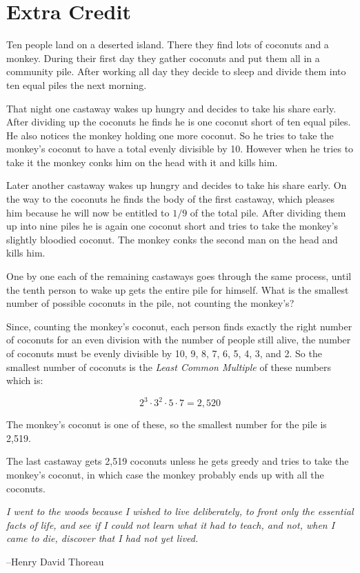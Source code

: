 \documentclass[fleqn,addpoints]{exam}
\begin{document}
\section{Extra Credit}
\begin{questions}

\question
Ten people land on a deserted island. There they find lots of coconuts and a monkey. During their first day they gather
coconuts and put them all in a community pile. After working all day they decide to sleep and divide them into ten equal
piles the next morning.

That night one castaway wakes up hungry and decides to take his share early. After dividing up the coconuts he finds he
is one coconut short of ten equal piles. He also notices the monkey holding one more coconut. So he tries to take the
monkey's coconut to have a total evenly divisible by 10. However when he tries to take it the monkey conks him on the
head with it and kills him.

Later another castaway wakes up hungry and decides to take his share early. On the way to the coconuts he finds the body
of the first castaway, which pleases him because he will now be entitled to $1/9$ of the total pile. After dividing them
up into nine piles he is again one coconut short and tries to take the monkey's slightly bloodied coconut. The monkey
conks the second man on the head and kills him.

One by one each of the remaining castaways goes through the same process, until the tenth person to wake up gets the
entire pile for himself. What is the smallest number of possible coconuts in the pile, not counting the monkey's?

\begin{solution}

Since, counting the monkey's coconut, each person finds exactly the right number of coconuts for an even division with
the number of people still alive, the number of coconuts must be evenly divisible by 10, 9, 8, 7, 6, 5, 4, 3, and 2.  So
the smallest number of coconuts is the {\em Least Common Multiple} of these numbers which is:

\[
  2^3 \cdot 3^2 \cdot 5 \cdot 7 = 2,520
\]

The monkey's coconut is one of these, so the smallest number for the pile is 2,519.  

The last castaway gets 2,519 coconuts unless he gets greedy and tries to take the monkey's coconut, in
which case the monkey probably ends up with all the coconuts.

\end{solution}

\end{questions}

\ifprintanswers
\else
\vspace{1 in}

{\em I went to the woods because I wished to live deliberately, to front only the essential facts of life, and see if I
  could not learn what it had to teach, and not, when I came to die, discover that I had not yet lived.}

\vspace{.1 cm}
\hspace{1 cm} --Henry David Thoreau

\fi
\end{document}
